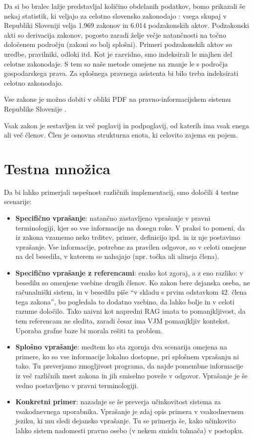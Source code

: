 \documentclass[a4paper,12pt,openright]{book}
\begin{document}
Da si bo bralec lažje predstavljal količino obdelanih podatkov, bomo prikazali še nekaj statistik, ki veljajo za celotno slovensko zakonodajo \cite{pisrs_stats}: vsega skupaj v Republiki Sloveniji velja 1.969 zakonov in 6.014 podzakonskih aktov. Podzakonski akti so derivacija zakonov, pogosto zaradi želje večje natančnosti na točno določenem področju (zakoni so bolj splošni). Primeri podzakonskih aktov so uredbe, pravilniki, odloki itd. Kot je razvidno, smo indeksirali le majhen del celotne zakonodaje. S tem so naše metode omejene na znanje le s področja gospodarskega prava. Za splošnega pravnega asistenta bi bilo treba indeksirati celotno zakonodajo.

Vse zakone je možno dobiti v obliki PDF na pravno-informacijskem sistemu Republike Slovenije \cite{pisrs}.

Vsak zakon je sestavljen iz več poglavij in podpoglavij, od katerih ima vsak enega ali več členov. Člen je osnovna strukturna enota, ki celovito zajema en pojem.

\section{Testna množica}

Da bi lahko primerjali uspešnost različnih implementacij, smo določili 4 testne scenarije:

\begin{itemize}
	\item \textbf{Specifično vprašanje}: natančno zastavljeno vprašanje v pravni terminologiji, kjer so vse informacije na dosegu roke. V praksi to pomeni, da iz zakona vzamemo neko trditev, primer, definicijo ipd. in iz nje postavimo vprašanje. Vse informacije, potrebne za pravilen odgovor, so v celoti omejene na del besedila, v katerem se nahajajo (npr. točka ali alineja člena).
	\item \textbf{Specifično vprašanje z referencami}: enako kot zgoraj, a z eno razliko: v besedilu so omenjene vsebine drugih členov. Ko zakon bere dejanska oseba, ne računalniški sistem, in v besedilu piše “v skladu s prvim odstavkom 42. člena tega zakona”, bo pogledala to dodatno vsebino, da lahko bolje in v celoti razume določilo. Tako naivni kot napredni RAG imata to pomanjkljivost, da tem referencam ne sledita, zaradi česar ima VJM pomanjkljiv kontekst. Uporaba grafne baze bi morala rešiti ta problem.
	\item \textbf{Splošno vprašanje}: medtem ko sta zgornja dva scenarija omejena na primere, ko so vse informacije lokalno dostopne, pri splošnem vprašanju ni tako. Tu preverjamo zmogljivost programa, da najde pomembne informacije iz več različnih mest zakona in jih smiselno poveže v odgovor. Vprašanje je še vedno postavljeno v pravni terminologiji.
	\item \textbf{Konkretni primer}: nazadnje se še preverja učinkovitost sistema za vsakodnevnega uporabnika. Vprašanje je zdaj opis primera v vsakodnevnem jeziku, ki mu sledi dejansko vprašanje. Tu se primerja še, kako učinkovito lahko sistem nadomesti pravno osebo (v nekem smislu tolmača) v postopku.
\end{itemize}
\end{document}

